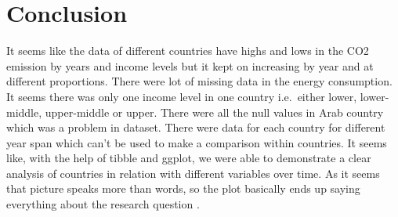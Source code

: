 \documentclass[11pt,a4paper,]{article}
\begin{document}
\hypertarget{conclusion}{%
\section{Conclusion}\label{conclusion}}

It seems like the data of different countries have highs and lows in the CO2 emission by years and income levels but it kept on increasing by year and at different proportions. There were lot of missing data in the energy consumption. It seems there was only one income level in one country i.e.~either lower, lower-middle, upper-middle or upper. There were all the null values in Arab country which was a problem in dataset. There were data for each country for different year span which can't be used to make a comparison within countries. It seems like, with the help of tibble and ggplot, we were able to demonstrate a clear analysis of countries in relation with different variables over time. As it seems that picture speaks more than words, so the plot basically ends up saying everything about the research question \textcite{wang2018urbanization}.

\printbibliography
\end{document}
